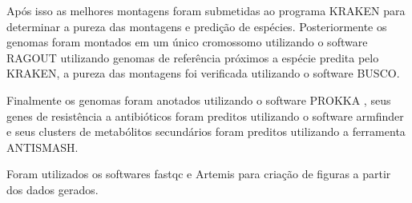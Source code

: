 Após isso as melhores montagens foram submetidas ao programa KRAKEN \cite{wood2019improved} para determinar a pureza
das montagens e predição de espécies. Posteriormente os genomas foram montados em um único cromossomo
utilizando o software RAGOUT\cite{kolmogorov2014ragout} utilizando genomas de referência próximos a espécie predita pelo KRAKEN, 
a pureza das montagens foi verificada utilizando o software BUSCO\cite{simao2015busco}.

Finalmente os genomas foram anotados utilizando o software
PROKKA \cite{seemann2014prokka} , seus genes de resistência a antibióticos foram preditos utilizando o software armfinder e seus clusters de metabólitos
secundários foram preditos utilizando a ferramenta ANTISMASH\cite{blin2021antismash}.

Foram utilizados os softwares fastqc\cite{andrews2019fastqc} e Artemis\cite{carver2012artemis} para criação de figuras a partir dos dados gerados.
